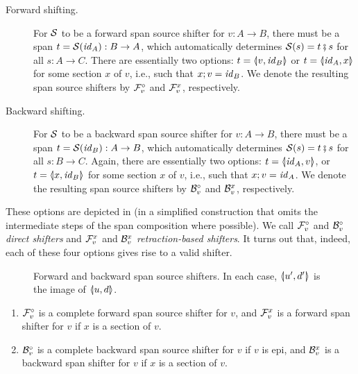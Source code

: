 \begin{description}
\item[Forward shifting.] For $\cS$ to be a forward span source shifter for $v:A\to B$, there must be a span $t=\cS(\id_A):B\to A$, which automatically determines $\cS(s)=t\spcomp s$ for all $s:A\to C$. There are essentially two options: $t=\spanof{v}{\id_B}$ or $t=\spanof{\id_A}{x}$ for some section $x$ of $v$, i.e., such that $x;v=\id_B$. We denote the resulting span source shifters by $\cF_v^\circ$ and $\cF_v^x$, respectively.

\item[Backward shifting.] For $\cS$ to be a backward span source shifter for $v:A\to B$, there must be a span $t=\cS(\id_B):A\to B$, which automatically determines $\cS(s)=t \spcomp s$ for all $s:B\to C$. Again, there are essentially two options: $t=\spanof{\id_A}{v}$, or $t=\spanof{x}{\id_B}$ for some section $x$ of $v$, i.e., such that $x;v=\id_A$. We denote the resulting span source shifters by $\cB_v^\circ$ and $\cB_v^x$, respectively.
\end{description}
%
These options are depicted in  (in a simplified construction that omits the intermediate steps of the span composition where possible). We call $\dF v$ and $\dB v$ \emph{direct shifters} and $\rF v x$ and $\rB v x$ \emph{retraction-based shifters}. It turns out that, indeed, each of these four options gives rise to a valid shifter.
%
\begin{figure}
\centering

\caption{Forward and backward span source shifters. In each case, $\spanof{u'}{d'}$ is the image of $\spanof{u}{d}$.}
\end{figure}
%
\begin{proposition}
\begin{enumerate}
\item $\cF_v^\circ$ is a complete forward span source shifter for $v$, and $\cF_v^x$ is a forward span shifter for $v$ if $x$ is a section of $v$.
\item $\cB_v^\circ$ is a complete backward span source shifter for $v$ if $v$ is epi, and $\cB_v^x$ is a backward span shifter for $v$ if $x$ is a section of $v$.
\end{enumerate}
\end{proposition}

